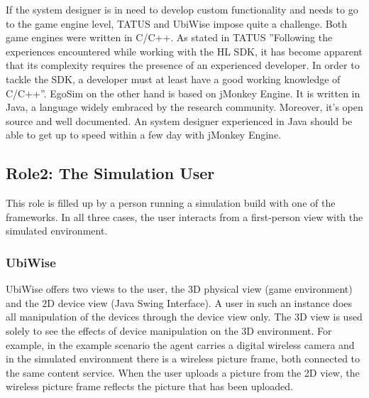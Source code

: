 If the system designer is in need to develop custom functionality and needs to go to the game engine level, TATUS and UbiWise impose quite a challenge. Both game engines were written in C/C++. As stated in TATUS ''Following the experiences encountered while working with the HL SDK, it has become apparent that its complexity requires the presence of an experienced developer. In order to tackle the SDK, a developer must at least have a good working knowledge of C/C++''. EgoSim on the other hand is based on jMonkey Engine. It is written in Java, a language widely embraced by the research community. Moreover, it's open source and well documented. An system designer experienced in Java should be able to get up to speed within a few day with jMonkey Engine.\\

\subsection{Role2: The Simulation User} %
\label{subsec:eval_role_simulation_user}
This role is filled up by a person running a simulation build with one of the frameworks. In all three cases, the user interacts from a first-person view with the simulated environment.\\

\subsubsection{UbiWise} %
UbiWise offers two views to the user, the 3D physical view (game environment) and the 2D device view (Java Swing Interface). A user in such an instance does all manipulation of the devices through the device view only. The 3D view is used solely to see the effects of device manipulation on the 3D environment. For example, in the example scenario the agent carries a digital wireless camera and in the simulated environment there is a wireless picture frame, both connected to the same content service. When the user uploads a picture from the 2D view, the wireless picture frame reflects the picture that has been uploaded.\\

